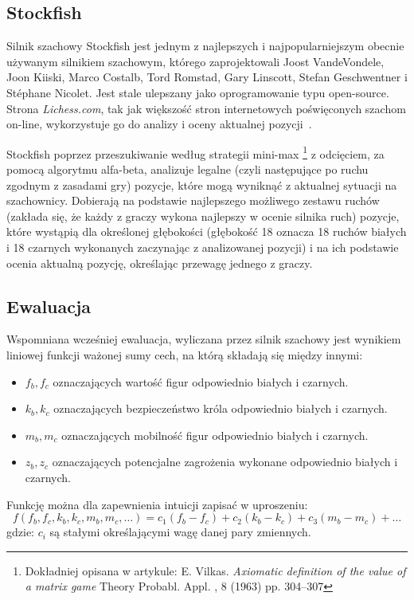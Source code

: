 \documentclass[inzynierska]{pwr_wmat_praca_dyplomowa}
\theoremstyle{plain}
\numberwithin{theorem}{chapter}
\theoremstyle{definition}
\numberwithin{theorem}{chapter}
\begin{document}
\subsection{Stockfish}
Silnik szachowy Stockfish \cite{stockfish} jest jednym z najlepszych i najpopularniejszym obecnie używanym silnikiem szachowym, którego zaprojektowali Joost VandeVondele, Joon Kiiski, Marco Costalb, Tord Romstad, Gary Linscott, Stefan Geschwentner i Stéphane Nicolet. Jest stale ulepszany jako oprogramowanie typu open-source. Strona \textit{Lichess.com}, tak jak większość stron internetowych poświęconych szachom on-line, wykorzystuje go do analizy i oceny aktualnej pozycji~\cite{stockfish_lichess}.

Stockfish poprzez przeszukiwanie według strategii mini-max \footnote{Dokładniej opisana w artykule: E. Vilkas. \textit{Axiomatic definition of the value of a matrix game} Theory Probabl. Appl. , 8 (1963) pp. 304–307} z odcięciem, za pomocą algorytmu alfa-beta, analizuje legalne (czyli następujące po ruchu zgodnym z zasadami gry) pozycje, które mogą wyniknąć z aktualnej sytuacji na szachownicy. Dobierają na podstawie najlepszego możliwego zestawu ruchów (zakłada się, że każdy z graczy wykona najlepszy w ocenie silnika ruch) pozycje, które wystąpią dla określonej głębokości (głębokość 18 oznacza 18 ruchów białych i 18 czarnych wykonanych zaczynając z analizowanej pozycji) i na ich podstawie ocenia aktualną pozycję, określając przewagę jednego z graczy.

\subsection{Ewaluacja}
Wspomniana wcześniej ewaluacja, wyliczana przez silnik szachowy jest wynikiem liniowej funkcji 
ważonej sumy cech, na którą składają się między innymi:
\begin{itemize}
	\item $f_b,f_c$ oznaczających wartość figur odpowiednio białych i czarnych.
	\item $k_b,k_c$ oznaczających bezpieczeństwo króla odpowiednio białych i czarnych.
	\item $m_b,m_c$ oznaczających mobilność figur odpowiednio białych i czarnych.
	\item $z_b,z_c$ oznaczających potencjalne zagrożenia wykonane odpowiednio białych i czarnych.
\end{itemize}
Funkcję można dla zapewnienia intuicji zapisać w uproszeniu:
\begin{equation}
	f(f_b,f_c,k_b,k_c,m_b,m_c,\dots)=c_1(f_b-f_c)+c_2(k_b-k_c)+c_3(m_b-m_c)+\dots
\end{equation}
gdzie:
$c_i$ są stałymi określającymi wagę danej pary zmiennych.
\end{document}

